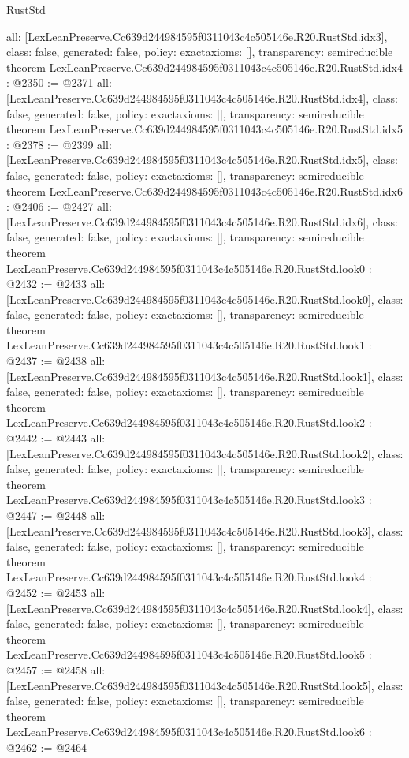\begin{lexlean}{RustStd}
\begin{coremodule}
{  all: [LexLeanPreserve.Cc639d244984595f0311043c4c505146e.R20.RustStd.idx3],
  class: false,
  generated: false,
  policy: exact{axioms: []},
  transparency: semireducible
}
theorem LexLeanPreserve.Cc639d244984595f0311043c4c505146e.R20.RustStd.idx4 : @2350 := @2371 {
  all: [LexLeanPreserve.Cc639d244984595f0311043c4c505146e.R20.RustStd.idx4],
  class: false,
  generated: false,
  policy: exact{axioms: []},
  transparency: semireducible
}
theorem LexLeanPreserve.Cc639d244984595f0311043c4c505146e.R20.RustStd.idx5 : @2378 := @2399 {
  all: [LexLeanPreserve.Cc639d244984595f0311043c4c505146e.R20.RustStd.idx5],
  class: false,
  generated: false,
  policy: exact{axioms: []},
  transparency: semireducible
}
theorem LexLeanPreserve.Cc639d244984595f0311043c4c505146e.R20.RustStd.idx6 : @2406 := @2427 {
  all: [LexLeanPreserve.Cc639d244984595f0311043c4c505146e.R20.RustStd.idx6],
  class: false,
  generated: false,
  policy: exact{axioms: []},
  transparency: semireducible
}
theorem LexLeanPreserve.Cc639d244984595f0311043c4c505146e.R20.RustStd.look0 : @2432 := @2433 {
  all: [LexLeanPreserve.Cc639d244984595f0311043c4c505146e.R20.RustStd.look0],
  class: false,
  generated: false,
  policy: exact{axioms: []},
  transparency: semireducible
}
theorem LexLeanPreserve.Cc639d244984595f0311043c4c505146e.R20.RustStd.look1 : @2437 := @2438 {
  all: [LexLeanPreserve.Cc639d244984595f0311043c4c505146e.R20.RustStd.look1],
  class: false,
  generated: false,
  policy: exact{axioms: []},
  transparency: semireducible
}
theorem LexLeanPreserve.Cc639d244984595f0311043c4c505146e.R20.RustStd.look2 : @2442 := @2443 {
  all: [LexLeanPreserve.Cc639d244984595f0311043c4c505146e.R20.RustStd.look2],
  class: false,
  generated: false,
  policy: exact{axioms: []},
  transparency: semireducible
}
theorem LexLeanPreserve.Cc639d244984595f0311043c4c505146e.R20.RustStd.look3 : @2447 := @2448 {
  all: [LexLeanPreserve.Cc639d244984595f0311043c4c505146e.R20.RustStd.look3],
  class: false,
  generated: false,
  policy: exact{axioms: []},
  transparency: semireducible
}
theorem LexLeanPreserve.Cc639d244984595f0311043c4c505146e.R20.RustStd.look4 : @2452 := @2453 {
  all: [LexLeanPreserve.Cc639d244984595f0311043c4c505146e.R20.RustStd.look4],
  class: false,
  generated: false,
  policy: exact{axioms: []},
  transparency: semireducible
}
theorem LexLeanPreserve.Cc639d244984595f0311043c4c505146e.R20.RustStd.look5 : @2457 := @2458 {
  all: [LexLeanPreserve.Cc639d244984595f0311043c4c505146e.R20.RustStd.look5],
  class: false,
  generated: false,
  policy: exact{axioms: []},
  transparency: semireducible
}
theorem LexLeanPreserve.Cc639d244984595f0311043c4c505146e.R20.RustStd.look6 : @2462 := @2464 {
}
\end{coremodule}
\end{lexlean}
